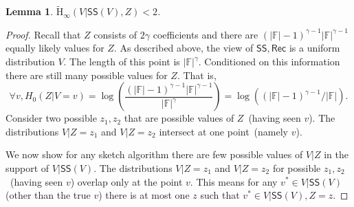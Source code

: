 \documentclass[11pt]{article}
\newtheorem{lemma}[theorem]{Lemma}
\newcommand{\class}[1]{{\ensuremath{\mathsf{#1}}}}
\newcommand{\sketch}{\ensuremath{\class{SS}}\xspace}
\newcommand{\rec}{\ensuremath{\class{Rec}}\xspace}
\newcommand{\Hav}{\tilde{\mathrm{H}}_\infty}
\begin{document}
\begin{lemma}
\label{lem:side info determines sketch}
$\Hav(V | \sketch(V), Z) <2$.
\end{lemma}
\begin{proof}
Recall that $Z$ consists of $2\gamma$ coefficients and there are $(|\mathbb{F}|-1)^{\gamma-1} |\mathbb{F}|^{\gamma-1}$ equally likely values for $Z$.
 As described above, the view of $\sketch, \rec$ is a uniform distribution $V$. 
The length of this point is $|\mathbb{F}|^\gamma$.  Conditioned on this information there are still many possible values for $Z$.  That is, 
 \[
 \forall v, H_0(Z | V=v) =\log \left(\frac{(|\mathbb{F}|-1)^{\gamma-1} |\mathbb{F}|^{\gamma-1}}{|\mathbb{F}|^\gamma}\right) = \log \left( (|\mathbb{F}|-1)^{\gamma-1}/|\mathbb{F}|\right).
 \]
Consider two possible $z_1, z_2$ that are possible values of $Z$~(having seen $v$).  The distributions $V| Z=z_1$ and $V | Z=z_2$ intersect at one point~(namely $v$).  

We now show for any sketch algorithm there are few possible values of $V|Z$ in the support of $V |\sketch(V)$.  The distributions $V | Z=z_1$ and $V| Z=z_2$ for possible $z_1, z_2$~(having seen $v$) overlap only at the point $v$.  This means for any $v^*\in V| \sketch(V)$ (other than the true $v$) there is at most one $z$ such that $v^*\in V | \sketch(V), Z=z$.  


\end{proof}
\end{document}
